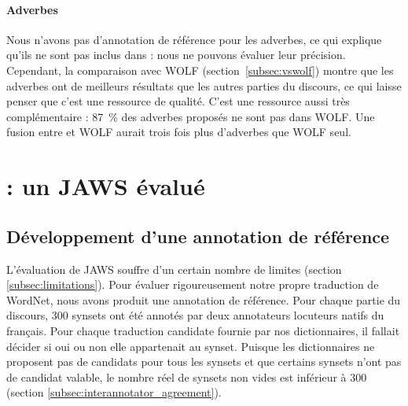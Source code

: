 \paragraph{Adverbes}

Nous n'avons pas d'annotation de référence pour les adverbes, ce qui explique qu'ils ne sont pas inclus dans \newjaws{} : nous ne pouvons évaluer leur précision. Cependant, la comparaison avec WOLF (section~\ref{subsec:vswolf}) montre que les adverbes ont de meilleurs résultats que les autres parties du discours, ce qui laisse penser que c'est une ressource de qualité. C'est une ressource aussi très complémentaire : 87~\% des adverbes proposés ne sont pas dans WOLF. Une fusion entre \newjaws{} et WOLF aurait trois fois plus d'adverbes que WOLF seul.

\section{\newjaws{}: un JAWS évalué}
\label{sec:evaluating_jaws}

\subsection{Développement d'une annotation de référence}
\label{subsec:gold_standard}

L'évaluation de JAWS souffre d'un certain nombre de limites (section \ref{subsec:limitations}). Pour évaluer rigoureusement notre propre traduction de WordNet, nous avons produit une annotation de référence. Pour chaque partie du discours, 300 synsets ont été annotés par deux annotateurs locuteurs natifs du français. Pour chaque traduction candidate fournie par nos dictionnaires, il fallait décider si oui ou non elle appartenait au synset. Puisque les dictionnaires ne proposent pas de candidats pour tous les synsets et que certains synsets n'ont pas de candidat valable, le nombre réel de synsets non vides est inférieur à 300 (section \ref{subsec:interannotator_agreement}).

